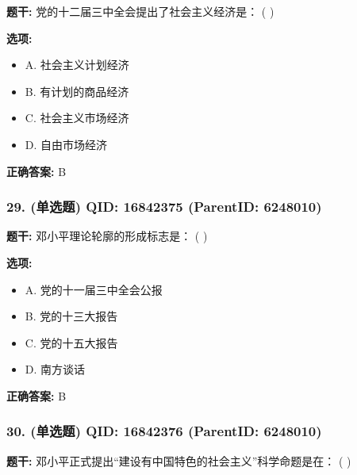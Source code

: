 \documentclass[12pt,UTF8]{ctexart}
\begin{document}
\textbf{题干:}
党的十二届三中全会提出了社会主义经济是： ( )



\textbf{选项:}
\begin{itemize}[leftmargin=*]

  \item A. 社会主义计划经济

  \item B. 有计划的商品经济

  \item C. 社会主义市场经济

  \item D. 自由市场经济

\end{itemize}

\textbf{正确答案:}
B

\vspace{0.3em}\hrulefill\vspace{0.7em}

\subsubsection*{29. (单选题) \small QID: 16842375 (ParentID: 6248010)}

\textbf{题干:}
邓小平理论轮廓的形成标志是： ( )



\textbf{选项:}
\begin{itemize}[leftmargin=*]

  \item A. 党的十一届三中全会公报

  \item B. 党的十三大报告

  \item C. 党的十五大报告

  \item D. 南方谈话

\end{itemize}

\textbf{正确答案:}
B

\vspace{0.3em}\hrulefill\vspace{0.7em}

\subsubsection*{30. (单选题) \small QID: 16842376 (ParentID: 6248010)}

\textbf{题干:}
邓小平正式提出“建设有中国特色的社会主义”科学命题是在： ( )
\end{document}
